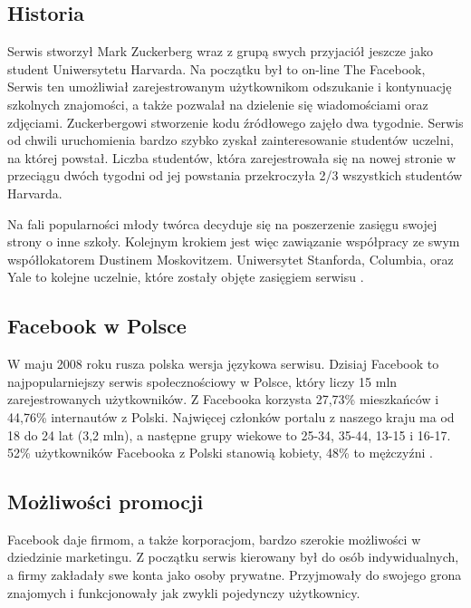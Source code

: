 
\subsection{Historia}
Serwis stworzył Mark Zuckerberg wraz z grupą swych przyjaciół jeszcze jako student Uniwersytetu Harvarda. Na początku był to on-line The Facebook, Serwis ten umożliwiał zarejestrowanym użytkownikom odszukanie i kontynuację szkolnych znajomości, a także pozwalał na dzielenie się wiadomościami oraz zdjęciami. Zuckerbergowi stworzenie kodu źródłowego zajęło dwa tygodnie. Serwis od chwili uruchomienia bardzo szybko zyskał zainteresowanie studentów uczelni, na której powstał. Liczba studentów, która zarejestrowała się na nowej stronie w przeciągu dwóch tygodni od jej powstania  przekroczyła 2/3 wszystkich studentów Harvarda.

Na fali popularności młody twórca decyduje się na poszerzenie zasięgu swojej strony o inne szkoły. Kolejnym krokiem jest więc zawiązanie współpracy ze swym współlokatorem Dustinem Moskovitzem. Uniwersytet Stanforda, Columbia, oraz Yale to kolejne uczelnie, które zostały objęte zasięgiem serwisu \cite{url:wiki-facebook}.


\subsection{Facebook w Polsce}
\label{subsec:facebook-w-polsce}
W maju 2008 roku rusza polska wersja językowa serwisu. Dzisiaj Facebook to najpopularniejszy serwis społecznościowy w Polsce, który liczy 15 mln zarejestrowanych użytkowników. Z Facebooka korzysta 27,73\% mieszkańców i 44,76\% internautów z Polski. Najwięcej członków portalu z naszego kraju ma od 18 do 24 lat (3,2 mln), a następne grupy wiekowe to 25-34, 35-44, 13-15 i 16-17. 52\% użytkowników Facebooka z Polski stanowią kobiety, 48\% to mężczyźni \cite{url:wp-facebook-w-polsce}.


\subsection{Możliwości promocji}
Facebook daje firmom, a także korporacjom, bardzo szerokie możliwości w dziedzinie marketingu. Z początku serwis kierowany był do osób indywidualnych, a firmy zakładały swe konta jako osoby prywatne. Przyjmowały do swojego grona znajomych  i funkcjonowały jak zwykli pojedynczy użytkownicy. 

